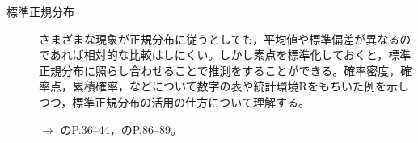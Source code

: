\begin{description}
	\item[標準正規分布]さまざまな現象が正規分布に従うとしても，平均値や標準偏差が異なるのであれば相対的な比較はしにくい。しかし素点を標準化しておくと，標準正規分布に照らし合わせることで推測をすることができる。確率密度，確率点，累積確率，などについて数字の表や統計環境Rをもちいた例を示しつつ，標準正規分布の活用の仕方について理解する。
	      \begin{flushright}
		      $\to$ \citet{Kawabata201408}のP.36--44，\citet{Yamada2004}のP.86--89。
	      \end{flushright}






\end{description}
